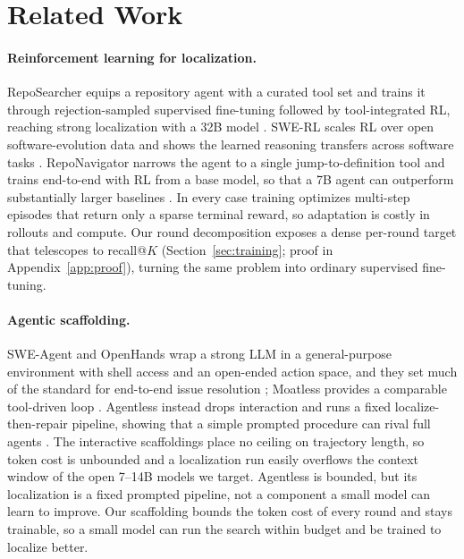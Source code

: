 \section{Related Work}
\label{sec:related}

\paragraph{Reinforcement learning for localization.}
RepoSearcher equips a repository agent with a curated tool set
and trains it through rejection-sampled supervised fine-tuning
followed by tool-integrated RL, reaching strong localization
with a 32B model \citep{ma2025tooltrain}. SWE-RL scales RL over
open software-evolution data and shows the learned reasoning
transfers across software tasks \citep{wei2025swerl}.
RepoNavigator narrows the agent to a single jump-to-definition
tool and trains end-to-end with RL from a base model, so that a
7B agent can outperform substantially larger baselines
\citep{zhang2025reponavigator}. In every case training optimizes
multi-step episodes that return only a sparse terminal reward,
so adaptation is costly in rollouts and compute. Our round
decomposition exposes a dense per-round target that telescopes
to recall@$K$ (Section~\ref{sec:training}; proof in
Appendix~\ref{app:proof}), turning the same
problem into ordinary supervised fine-tuning.

\paragraph{Agentic scaffolding.}
SWE-Agent and OpenHands wrap a strong LLM in a general-purpose
environment with shell access and an open-ended action space,
and they set much of the standard for end-to-end issue
resolution \citep{yang2024sweagent, wang2025openhands}; Moatless
provides a comparable tool-driven loop \citep{orwall2024moatless}.
Agentless instead drops interaction and runs a fixed
localize-then-repair pipeline, showing that a simple prompted
procedure can rival full agents \citep{xia2024agentless}. The
interactive scaffoldings place no ceiling on trajectory length,
so token cost is unbounded and a localization run easily
overflows the context window of the open 7--14B models we
target. Agentless is bounded, but its localization is a fixed
prompted pipeline, not a component a small model can learn to
improve. Our scaffolding bounds the token cost of every round
and stays trainable, so a small model can run the search within
budget and be trained to localize better.

